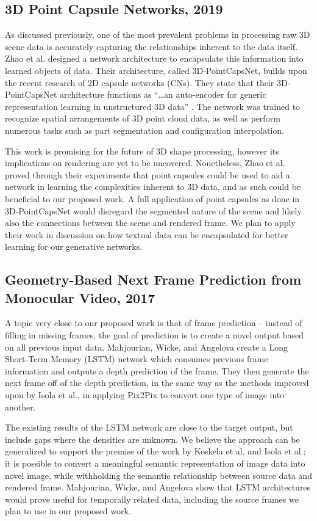 \documentclass{article}
\begin{document}
\subsection*{3D Point Capsule Networks, 2019}
\nocite{point_capsule}
As discussed previously, one of the most prevalent problems in processing raw 3D
scene data is accurately capturing the relationships inherent to the data itself.
Zhao et al. designed a network architecture to encapsulate this information into
learned objects of data. Their architecture, called 3D-PointCapsNet,
builds upon the recent research of 2D capsule networks (CNs).
They state that their 3D-PointCapsNet architecture functions as
``\dots an auto-encoder for generic representation
learning in unstructured 3D data'' \cite{point_capsule}. The network was trained
to recognize spatial arrangements of 3D point cloud data, as well as perform
numerous tasks such as part segmentation and configuration interpolation.

This work is promising for the future of 3D shape processing, however its
implications on rendering are yet to be uncovered. Nonetheless, Zhao et al.
proved through their experiments that point capsules could be used to
aid a network in learning the complexities inherent to 3D data, and as such
could be beneficial to our proposed work. A full application of point capsules
as done in 3D-PointCapsNet would disregard the segmented nature of the scene and
likely also the connections between the scene and rendered frame.
We plan to apply their work in discussion on how textual data can be encapsulated
for better learning for our generative networks.

\subsection*{Geometry-Based Next Frame Prediction from Monocular Video, 2017}
\nocite{frame_prediction}
A topic very close to our proposed work is that of frame prediction --
instead of filling in missing frames, the goal of prediction is to create a novel
output based on all previous input data.
Mahjourian, Wicke, and Angelova create a Long Short-Term Memory (LSTM) network
which consumes previous frame information and outputs a depth prediction of the
frame. They then generate the next frame off of the depth prediction, in the same
way as the methods improved upon by Isola et al., in applying Pix2Pix to convert 
one type of image into another.

The existing results of the LSTM network are close to the
target output, but include gaps where the densities are unknown.
We believe the approach can be generalized to support the premise of
the work by Koskela et al. and Isola et al.;
it is possible to convert a meaningful semantic representation
of image data into novel image, while withholding the semantic relationship
between source data and rendered frame. Mahjourian, Wicke, and Angelova show that
LSTM architectures would prove useful for temporally related data,
including the source frames we plan to use in our proposed work.
\end{document}
